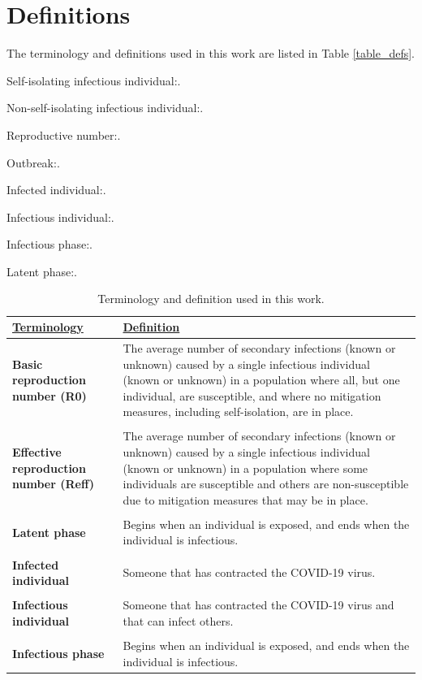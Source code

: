 \documentclass[sr]{drdc-report}
\begin{document}
\section{Definitions}\label{first_section_label}
The terminology and definitions used in this work are listed in Table \ref{table_defs}.

Self-isolating infectious individual:.

Non-self-isolating infectious individual:.

Reproductive number:.

Outbreak:.

Infected individual:.

Infectious individual:.

Infectious phase:.

Latent phase:.

\begin{table}
\centering
\caption{Terminology and definition used in this work.}\label{table0}
\begin{tabular}{|p{5cm}|p{10cm}|}
\textbf{\underline{Terminology}} & \textbf{\underline{Definition}}\\
\hline
\textbf{Basic reproduction number (R0)} & The average number of secondary infections (known or unknown) caused by a single infectious individual (known or unknown) in a population where all, but one individual, are susceptible, and where no mitigation measures, including self-isolation, are in place.\\
&\\
\textbf{Effective reproduction number (Reff)} & The average number of secondary infections (known or unknown) caused by a single infectious individual (known or unknown) in a population where some individuals are susceptible and others are non-susceptible due to mitigation measures that may be in place.\\
&\\
\textbf{Latent phase} & Begins when an individual is exposed, and ends when the individual is infectious.\\
&\\
\textbf{Infected individual} & Someone that has contracted the COVID-19 virus.\\
&\\
\textbf{Infectious individual} & Someone that has contracted the COVID-19 virus and that can infect others.\\
&\\
\textbf{Infectious phase} & Begins when an individual is exposed, and ends when the individual is infectious.\\

\end{tabular}
\end{table}
\end{document}

